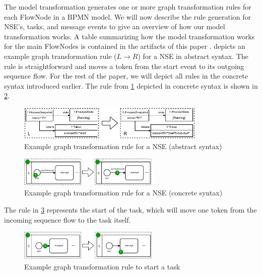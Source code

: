 \documentclass[submission, copyright, creativecommons]{eptcs}
\begin{document}
The model transformation generates one or more graph transformation rules for each \textsf{FlowNode} in a BPMN model.
We will now describe the rule generation for NSE's, tasks, and message events to give an overview of how our model transformation works.
A table summarizing how the model transformation works for the main \textsf{FlowNodes} is contained in the artifacts of this paper \cite{timkrauterArtifactsTERMGRAPH2022}.
 depicts an example graph transformation rule ($L \to R$) for a NSE in abstract syntax.
The rule is straightforward and moves a token from the start event to its outgoing sequence flow.
For the rest of the paper, we will depict all rules in the concrete syntax introduced earlier.
The rule from \cref{fig:gtRuleAbstract} depicted in concrete syntax is shown in \cref{fig:gtRuleConcrete}.

\begin{figure}[h]
    \centering
  \includegraphics[width=0.8\textwidth]{images/rule_abstract.pdf}
  \caption{Example graph transformation rule for a NSE (abstract syntax)}  \label{fig:gtRuleAbstract}
\end{figure}

\begin{figure}[h]
    \centering
  \includegraphics[width=0.6\textwidth]{images/rule_concrete.pdf}
  \caption{Example graph transformation rule for a NSE (concrete syntax)}
  \label{fig:gtRuleConcrete}
\end{figure}

The rule in \cref{fig:taskRules} represents the start of the task, which will move one token from the incoming sequence flow to the task itself.

\begin{figure}[h]
    \centering
    \includegraphics[width=0.6\textwidth]{images/bpmn_semantics-rules.pdf}
    \caption{Example graph transformation rule to start a task}
    \label{fig:taskRules}
\end{figure}
\end{document}
